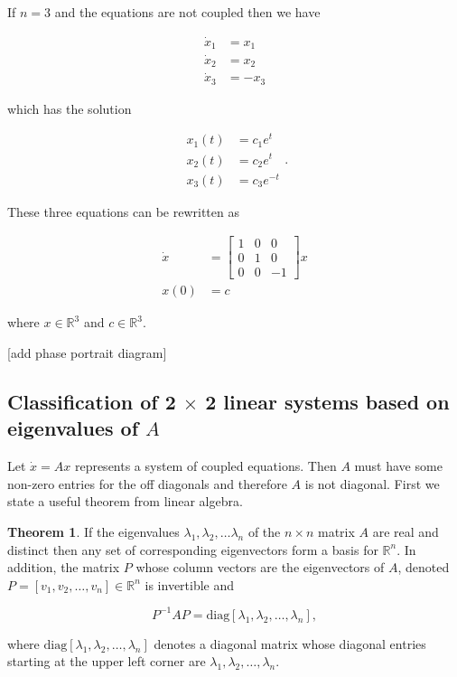 \documentclass[12pt]{article}
\theoremstyle{definition}
\newtheorem{theorem}{Theorem}[section]  %
\begin{document}
If $n = 3$ and the equations are not coupled then we have

\begin{equation*}
\begin{split}
\dot x_1 &= x_1 \\
\dot x_2 &= x_2 \\
\dot x_3 &= -x_3
\end{split}
\end{equation*}

which has the solution

\begin{equation*}
\begin{split}
x_1(t) &= c_1 e^t \\
x_2(t) &= c_2 e^t \\
x_3(t) &= c_3 e^{-t}
\end{split}
.
\end{equation*}

These three equations can be rewritten as

\begin{equation*}
\begin{split}
\dot x &= 
\begin{bmatrix}
1 & 0 & 0 \\
0 & 1 & 0 \\
0 & 0 & -1
\end{bmatrix}
x  \\
x(0) &= c 
\end{split}
\end{equation*}

where $x \in \mathbb{R}^3$ and $c \in \mathbb{R}^3$.


[add phase portrait diagram]


\subsection{Classification of 2 $\times$ 2 linear systems based on eigenvalues of $A$}

Let $\dot x = Ax$ represents a system of coupled equations. Then $A$ must have some non-zero entries for the off diagonals and therefore $A$ is not diagonal. First we state a useful theorem from linear algebra.

\begin{theorem}
If the eigenvalues $\lambda_1, \lambda_2, \ldots \lambda_n$ of the $n \times n$ matrix $A$ are real and distinct then any set of corresponding eigenvectors form a basis for $\mathbb{R}^n$. In addition, the matrix $P$ whose column vectors are the eigenvectors of $A$, denoted $P = [v_1, v_2, \ldots, v_n] \in \mathbb{R}^n$ is invertible and

$$ P^{-1}AP = \text{diag}[\lambda_1, \lambda_2, \ldots, \lambda_n], $$

where $\text{diag}[\lambda_1, \lambda_2, \ldots, \lambda_n]$ denotes a diagonal matrix whose diagonal entries starting at the upper left corner are $\lambda_1, \lambda_2, \ldots, \lambda_n$.
\end{theorem}
\end{document}

